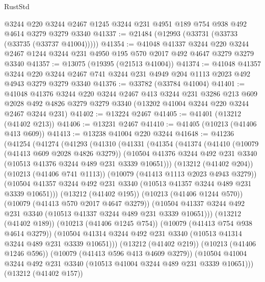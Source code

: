 \begin{lexlean}{RustStd}
\begin{coremodule}
    @3244
    @220
    @3244
    @2467
    @1245
    @3244
    @231
    @4951
    @189
    @754
    @938
    @492
    @4614
    @3279
    @3279
    @3340
@41337 := @21484 (@12993 (@33731 (@33733 (@33735 (@33737 @41004)))))
@41354 := @41048
    @41337
    @3244
    @220
    @3244
    @2467
    @1244
    @3244
    @231
    @4950
    @195
    @570
    @2017
    @492
    @4647
    @3279
    @3279
    @3340
@41357 := @13075 (@19395 (@21513 @41004))
@41374 := @41048
    @41357
    @3244
    @220
    @3244
    @2467
    @741
    @3244
    @231
    @4949
    @204
    @1113
    @2023
    @492
    @4943
    @3279
    @3279
    @3340
@41376 := @33782 (@33784 @41004)
@41401 := @41048
    @41376
    @3244
    @220
    @3244
    @2467
    @413
    @3244
    @231
    @3286
    @213
    @609
    @2028
    @492
    @4826
    @3279
    @3279
    @3340
    (@13202 @41004 @3244 @220 @3244 @2467 @3244 @231)
@41402 := @13224 @2467
@41405 := @41401 (@13212 (@41402 @213))
@41406 := @13231 @2467
@41410 := @41405 (@10213 (@41406 @413 @609))
@41413 := @13238 @41004 @220 @3244
@41648 := @41236
    (@41254
      (@41274
        (@41293
          (@41310
            (@41331
              (@41354
                (@41374
                  (@41410
                    (@10079 (@41413 @609 @2028 @4826 @3279))
                    (@10504
                      @41376
                      @3244
                      @492
                      @231
                      @3340
                      (@10513 @41376 @3244 @489 @231 @3339 @10651)))
                  (@13212 (@41402 @204))
                  (@10213 (@41406 @741 @1113))
                  (@10079 (@41413 @1113 @2023 @4943 @3279))
                  (@10504
                    @41357
                    @3244
                    @492
                    @231
                    @3340
                    (@10513 @41357 @3244 @489 @231 @3339 @10651)))
                (@13212 (@41402 @195))
                (@10213 (@41406 @1244 @570))
                (@10079 (@41413 @570 @2017 @4647 @3279))
                (@10504 @41337 @3244 @492 @231 @3340 (@10513 @41337 @3244 @489 @231 @3339 @10651)))
              (@13212 (@41402 @189))
              (@10213 (@41406 @1245 @754))
              (@10079 (@41413 @754 @938 @4614 @3279))
              (@10504 @41314 @3244 @492 @231 @3340 (@10513 @41314 @3244 @489 @231 @3339 @10651)))
            (@13212 (@41402 @219))
            (@10213 (@41406 @1246 @596))
            (@10079 (@41413 @596 @413 @4609 @3279))
            (@10504 @41004 @3244 @492 @231 @3340 (@10513 @41004 @3244 @489 @231 @3339 @10651)))
          (@13212 (@41402 @157))

\end{coremodule}
\end{lexlean}
